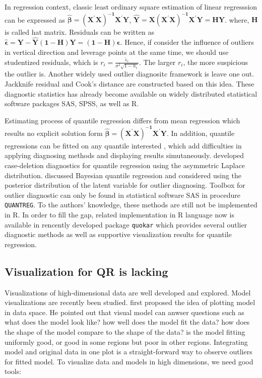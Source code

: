 \documentclass[article]{jss}
\theoremstyle{definition}
\theoremstyle{definition}
\theoremstyle{remark}
\begin{document}
In regression context, classic least ordinary square estimation of
linear regresssion can be expressed as
\(\hat{\boldsymbol{\beta}}=\boldsymbol{(X^{'}X)^{-1}X^{'}Y}\),
\(\hat{\boldsymbol{Y}}=\boldsymbol{X(X^{'}X)^{-1}X^{'}Y}=\boldsymbol{HY}\).
where, \(\boldsymbol{H}\) is called hat matrix. Residuals can be written
as
\(\hat{\boldsymbol{\epsilon}}=\boldsymbol{Y-\hat{Y}(1-H)Y}=\boldsymbol{(1-H)\epsilon}\).
Hence, if consider the influence of outliers in vertical direction and
leverage points at the same time, we should use studentized residuals,
which is \(r_i=\frac{\hat{\epsilon}_{i}}{\sigma^{2}\sqrt{1-h_i}}\). The
larger \(r_i\), the more suspicious the outlier is. Another widely used
outlier diagnositc framework is leave one out. Jackknife residual and
Cook's distance are constructed based on this idea. These diagnostic
statistics has already become available on widely distributed
statistical software packages SAS, SPSS, as well as R.

Estimating process of quantile regression differs from mean regression
which results no explicit solution form
\(\hat{\boldsymbol{\beta}}=\boldsymbol{(X^{'}X)^{-1}X^{'}Y}\). In
addition, quantile regressions can be fitted on any quantile interested
, which add difficulties in applying diagnosing methods and displaying
results simutaneously. \citet{sanchez2013likelihood} developed
case-deletion diagnostics for quantile regression using the asymmetric
Laplace distribution. \citet{santos2016bayesian} discussed Bayesian
quantile regression and considered using the posterior distribution of
the latent variable for outlier diagnosing. Toolbox for outlier
diagnostic can only be found in statistical software SAS in procedure
\texttt{QUANTREG}. To the authors' knowledge, these methods are still
not be implemented in R. In order to fill the gap, related
implementation in R language now is available in rencently developed
package \texttt{quokar} which provides several outlier diagnostic
methods as well as supportive visualization results for quantile
regression.

\subsection{Visualization for QR is
lacking}\label{visualization-for-qr-is-lacking}

Visualizations of high-dimensional data are well developed and explored.
Model visualizations are recently been studied.
\citet{wickham2015visualizing} first proposed the idea of plotting model
in data space. He pointed out that visual model can anwser questions
such as what does the model look like? how well does the model fit the
data? how does the shape of the model compare to the shape of the data?
is the model fitting uniformly good, or good in some regions but poor in
other regions. Integrating model and original data in one plot is a
straight-forward way to observe outliers for fitted model. To visualize
data and models in high dimensions, we need good tools:
\end{document}
